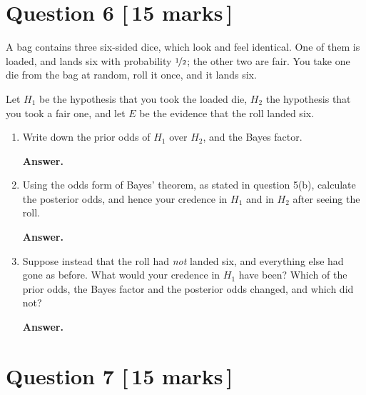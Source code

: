 \documentclass[11pt]{article}
\theoremstyle{definition}
\newenvironment{answer}
  {\par\medskip\noindent\textbf{Answer.}\par\nobreak\smallskip\ignorespaces}
  {\par\medskip}
\begin{document}
\section*{Question 6 \hfill \normalsize [\,15 marks\,]}

A bag contains three six-sided dice, which look and feel identical. One of them
is loaded,
and lands six with probability $\nicefrac{1}{2}$; the other two are fair. You
take one die from the bag at random, roll it once, and it lands six.

Let $H_1$ be the hypothesis that you took the loaded die, $H_2$ the hypothesis
that you took a fair one, and let $E$ be the evidence that the roll landed six.

\begin{enumerate}[label=(\alph*)]

\item Write down the prior odds of $H_1$ over $H_2$, and the Bayes factor.

\begin{answer}
\end{answer}

\item Using the odds form of Bayes' theorem, as stated in question 5(b),
calculate the posterior odds, and hence your credence in $H_1$ and in $H_2$ after
seeing the roll.

\begin{answer}
\end{answer}

\item Suppose instead that the roll had \emph{not} landed six, and everything
else had gone as before. What would your credence in $H_1$ have been? Which of
the prior odds, the Bayes factor and the posterior odds changed, and which did
not?

\begin{answer}
\end{answer}

\end{enumerate}

\section*{Question 7 \hfill \normalsize [\,15 marks\,]}
\end{document}
